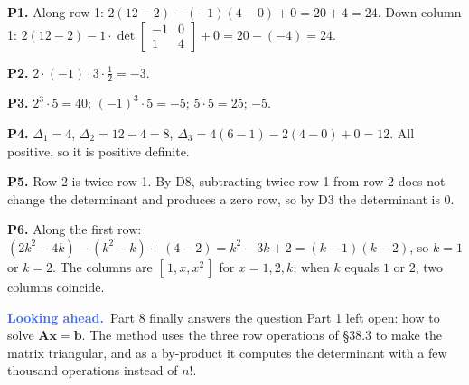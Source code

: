 \documentclass[11pt]{article}
\theoremstyle{plain}
\theoremstyle{definition}
\theoremstyle{remark}
\newcommand{\lookahead}{\par\smallskip\noindent
  \textbf{\sffamily\textcolor{RoyalBlue}{Looking ahead.}}\ \ignorespaces}
\newcommand{\vc}[1]{\mathbf{#1}}
\newcommand{\mt}[1]{\mathbf{#1}}
\begin{document}
\noindent\textbf{P1.} Along row 1: $2(12-2)-(-1)(4-0)+0=20+4=24$. Down column 1:
$2(12-2)-1\cdot\det\begin{bmatrix}-1&0\\1&4\end{bmatrix}+0=20-(-4)=24$.
\checkmark

\smallskip
\noindent\textbf{P2.} $2\cdot(-1)\cdot3\cdot\frac12=-3$.

\smallskip
\noindent\textbf{P3.} $2^{3}\cdot5=40$; $(-1)^{3}\cdot5=-5$; $5\cdot5=25$;
$-5$.

\smallskip
\noindent\textbf{P4.} $\Delta_1=4$, $\Delta_2=12-4=8$,
$\Delta_3=4(6-1)-2(4-0)+0=12$. All positive, so it is positive definite.

\smallskip
\noindent\textbf{P5.} Row 2 is twice row 1. By D8, subtracting twice row 1 from
row 2 does not change the determinant and produces a zero row, so by D3 the
determinant is $0$.

\smallskip
\noindent\textbf{P6.} Along the first row:
$(2k^{2}-4k)-(k^{2}-k)+(4-2)=k^{2}-3k+2=(k-1)(k-2)$, so $k=1$ or $k=2$. The
columns are $[\,1,x,x^{2}\,]$ for $x=1,2,k$; when $k$ equals $1$ or $2$, two
columns coincide.

\lookahead Part 8 finally answers the question Part 1 left open: how to solve
$\mt{A}\vc{x}=\vc{b}$. The method uses the three row operations of \S38.3 to
make the matrix triangular, and as a by-product it computes the determinant
with a few thousand operations instead of $n!$.
\end{document}
